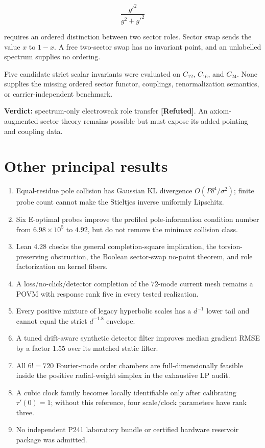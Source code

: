 \documentclass[11pt,a4paper,openany]{report}
\newcommand{\statusRefuted}{\textcolor{finred}{[Refuted]}}
\begin{document}
\[
\frac{g'^2}{g^2+g'^2}
\]

requires an ordered distinction between two sector roles. Sector swap sends the value \(x\) to \(1-x\). A free two-sector swap has no invariant point, and an unlabelled spectrum supplies no ordering.

Five candidate strict scalar invariants were evaluated on \(C_{12}\), \(C_{16}\), and \(C_{24}\). None supplies the missing ordered sector functor, couplings, renormalization semantics, or carrier-independent benchmark.

\textbf{Verdict:} spectrum-only electroweak role transfer \textbf{\statusRefuted{}}. An axiom-augmented sector theory remains possible but must expose its added pointing and coupling data.

\section{Other principal results}

\begin{enumerate}
\item 
Equal-residue pole collision has Gaussian KL divergence \(O(P\delta^4/\sigma^2)\); finite probe count cannot make the Stieltjes inverse uniformly Lipschitz.

\item 
Six E-optimal probes improve the profiled pole-information condition number from \(6.98\times10^5\) to \(4.92\), but do not remove the minimax collision class.

\item 
Lean 4.28 checks the general completion-square implication, the torsion-preserving obstruction, the Boolean sector-swap no-point theorem, and role factorization on kernel fibers.

\item 
A loss/\allowbreak{}no-click/\allowbreak{}detector completion of the \(72\)-mode current mesh remains a POVM with response rank five in every tested realization.

\item 
Every positive mixture of legacy hyperbolic scales has a \(d^{-1}\) lower tail and cannot equal the strict \(d^{-1.8}\) envelope.

\item 
A tuned drift-aware synthetic detector filter improves median gradient RMSE by a factor \(1.55\) over its matched static filter.

\item 
All \(6!=720\) Fourier-mode order chambers are full-dimensionally feasible inside the positive radial-weight simplex in the exhaustive LP audit.

\item 
A cubic clock family becomes locally identifiable only after calibrating \(\tau'(0)=1\); without this reference, four scale/\allowbreak{}clock parameters have rank three.

\item 
No independent P241 laboratory bundle or certified hardware reservoir package was admitted.

\end{enumerate}
\end{document}

